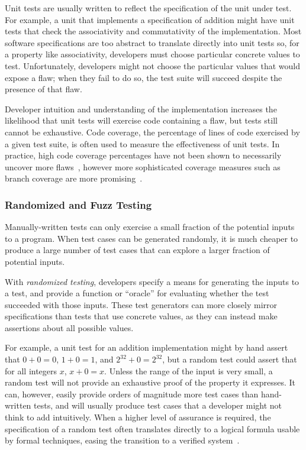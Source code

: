Unit tests are usually written to reflect the specification of the
unit under test. For example, a unit that implements a specification
of addition might have unit tests that check the associativity and
commutativity of the implementation. Most software specifications are
too abstract to translate directly into unit tests so, for a property
like associativity, developers must choose particular concrete values
to test. Unfortunately, developers might not choose the particular
values that would expose a flaw; when they fail to do so, the test
suite will succeed despite the presence of that flaw.

Developer intuition and understanding of the implementation increases
the likelihood that unit tests will exercise code containing a flaw,
but tests still cannot be exhaustive. Code coverage, the percentage of
lines of code exercised by a given test suite, is often used to
measure the effectiveness of unit tests. In practice, high code
coverage percentages have not been shown to necessarily uncover more
flaws~\cite{inozemtseva2014coverage}, however more sophisticated
coverage measures such as branch coverage are more
promising~\cite{gligoric2013comparing}.

\subsubsection{Randomized and Fuzz Testing}

Manually-written tests can only exercise a small fraction of the
potential inputs to a program. When test cases can be generated
randomly, it is much cheaper to produce a large number of test cases
that can explore a larger fraction of potential inputs.

With \emph{randomized testing}, developers specify a means for
generating the inputs to a test, and provide a function or ``oracle''
for evaluating whether the test succeeded with those inputs. These
test generators can more closely mirror specifications than tests that
use concrete values, as they can instead make assertions about all
possible values.

For example, a unit test for an addition implementation might by hand
assert that $0+0=0$, $1+0=1$, and $2^{32}+0=2^{32}$, but a random test
could assert that for all integers $x$, $x+0=x$. Unless the range of
the input is very small, a random test will not provide an exhaustive
proof of the property it expresses. It can, however, easily provide
orders of magnitude more test cases than hand-written tests, and will
usually produce test cases that a developer might not think to add
intuitively. When a higher level of assurance is required, the
specification of a random test often translates directly to a logical
formula usable by formal techniques, easing the transition to a
verified system~\cite{swierstra2012xmonad}.

